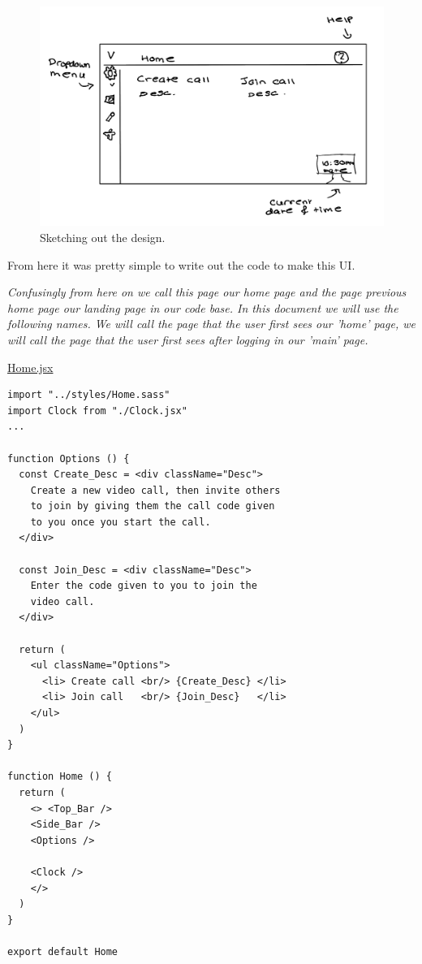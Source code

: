 \begin{figure}[h]
\centering

\includegraphics[scale=0.2]{Images/Home_sketch.png}

\caption{Sketching out the design.}
\end{figure}

From here it was pretty simple to write out the code to make
this UI. \\ \vspace{0.1cm}

\textit{Confusingly from here on we call this page
our home page and the page previous home page our landing
page in our code base. In this document we will use the 
following names. We will call the page that the user first 
sees our 'home' page, we will call the page that the user
first sees after logging in our 'main' page.} \\
\vspace{0.2cm}

\underline{Home.jsx}

\begin{verbatim}
import "../styles/Home.sass"
import Clock from "./Clock.jsx"
...

function Options () {
  const Create_Desc = <div className="Desc"> 
    Create a new video call, then invite others
    to join by giving them the call code given 
    to you once you start the call.
  </div>

  const Join_Desc = <div className="Desc"> 
    Enter the code given to you to join the 
    video call.
  </div>

  return (
    <ul className="Options">
      <li> Create call <br/> {Create_Desc} </li>
      <li> Join call   <br/> {Join_Desc}   </li>
    </ul>
  )
}

function Home () {
  return (
    <> <Top_Bar />
    <Side_Bar />
    <Options />

    <Clock /> 
    </> 
  )
}

export default Home
\end{verbatim}

